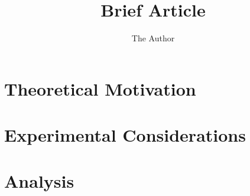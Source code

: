 \documentclass[12pt]{report}
\title{Brief Article}
\author{The Author}
\begin{document}
\chapter{Theoretical Motivation}



%

\chapter{Experimental Considerations}




\chapter{Analysis}



%


%
\end{document}
